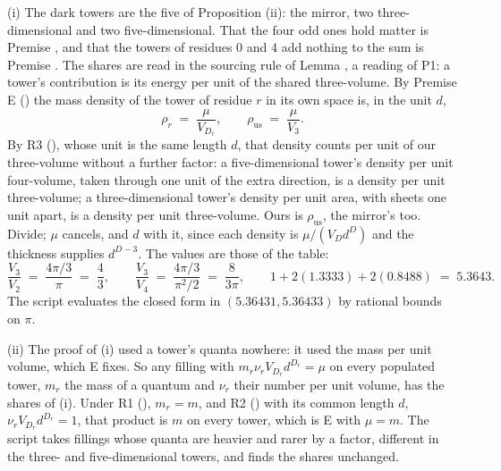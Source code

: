 (i) The dark towers are the five of Proposition (ii): the mirror, two three-dimensional and two five-dimensional. That the four odd ones hold matter is Premise , and that the towers of residues $0$ and $4$ add nothing to the sum is Premise . The shares are read in the sourcing rule of Lemma , a reading of P1: a tower's contribution is its energy per unit of the shared three-volume. By Premise E () the mass density of the tower of residue $r$ in its own space is, in the unit $d$,
\[
\rho_{r} \;=\; \frac{\mu}{V_{D_{r}}}, \qquad \rho_{\mathrm{us}} \;=\; \frac{\mu}{V_{3}}.
\]
By R3 (), whose unit is the same length $d$, that density counts per unit of our three-volume without a further factor: a five-dimensional tower's density per unit four-volume, taken through one unit of the extra direction, is a density per unit three-volume; a three-dimensional tower's density per unit area, with sheets one unit apart, is a density per unit three-volume. Ours is $\rho_{\mathrm{us}}$, the mirror's too. Divide; $\mu$ cancels, and $d$ with it, since each density is $\mu/(V_{D}d^{D})$ and the thickness supplies $d^{D-3}$. The values are those of the table:
\[
\frac{V_{3}}{V_{2}} \;=\; \frac{4\pi/3}{\pi} \;=\; \frac{4}{3}, \qquad
\frac{V_{3}}{V_{4}} \;=\; \frac{4\pi/3}{\pi^{2}/2} \;=\; \frac{8}{3\pi}, \qquad
1 + 2(1.3333) + 2(0.8488) \;=\; 5.3643 .
\]
The script evaluates the closed form in $(5.36431, 5.36433)$ by rational bounds on $\pi$.

(ii) The proof of (i) used a tower's quanta nowhere: it used the mass per unit volume, which E fixes. So any filling with $m_{r}\nu_{r}V_{D_{r}}d^{D_{r}} = \mu$ on every populated tower, $m_{r}$ the mass of a quantum and $\nu_{r}$ their number per unit volume, has the shares of (i). Under R1 (), $m_{r} = m$, and R2 () with its common length $d$, $\nu_{r}V_{D_{r}}d^{D_{r}} = 1$, that product is $m$ on every tower, which is E with $\mu = m$. The script takes fillings whose quanta are heavier and rarer by a factor, different in the three- and five-dimensional towers, and finds the shares unchanged.

